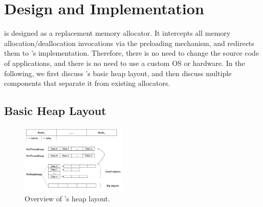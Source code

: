 \section{Design and Implementation}
\label{sec:implement}

\NM{} is designed as a replacement memory allocator. It intercepts all memory allocation/deallocation invocations via the preloading mechanism, and redirects them to \NM{}'s implementation. Therefore, there is no need to change the source code of applications, and there is no need to use a custom OS or hardware. In the following, we first discuss \NM{}'s basic heap layout, and then discuss multiple components that separate it from existing allocators.

\subsection{Basic Heap Layout}
\label{sec:overview}

\begin{figure}[!ht]
\begin{center}
\includegraphics[width=0.45\textwidth]{figure/numalloc-overview.png}
\end{center}
\caption{Overview of \NA{}'s heap layout.
\label{fig:overview}}
\end{figure}

